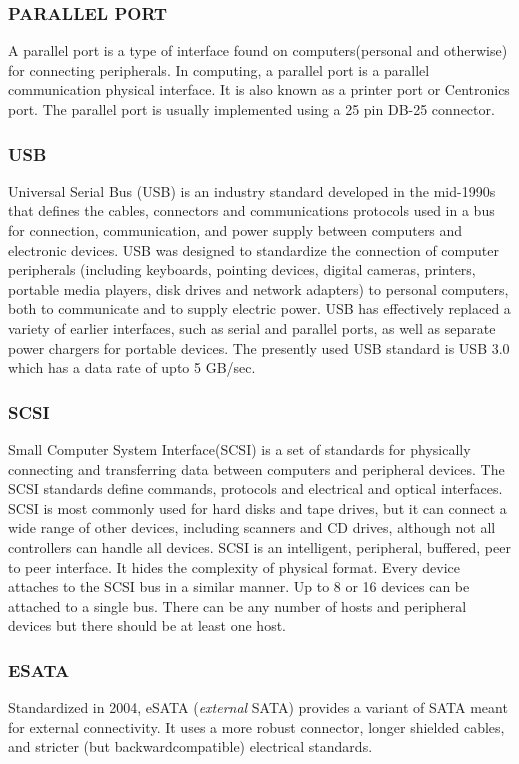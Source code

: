 \documentclass[a4paper,28pt]{report}
\begin{document}
\subsubsection*{PARALLEL PORT}
	 A parallel port is a type of interface found on computers(personal and otherwise) for
	connecting peripherals. In computing, a parallel port is a parallel communication physical interface. It is
	also known as a printer port or Centronics port. The parallel port is usually implemented using a 25 pin DB-25 connector.
\subsubsection*{ USB}
	 Universal Serial Bus (USB) is an industry standard developed in the mid-1990s that defines the
	cables, connectors and communications protocols used in a bus for connection, communication, and power
	supply between computers and electronic devices. USB was designed to standardize the connection
	of computer peripherals (including keyboards, pointing devices, digital cameras, printers, portable media
	players, disk drives and network adapters) to personal computers, both to communicate and to
	supply electric power. USB has effectively replaced a variety of earlier interfaces, such as serial and parallel 		ports,
	as well as separate power chargers for portable devices. The presently used USB standard is USB 3.0 which
	has a data rate of upto 5 GB/sec.
\subsubsection*{ SCSI}
	 Small Computer System Interface(SCSI) is a set of standards for physically connecting and
	transferring data between computers and peripheral devices. The SCSI standards define commands,
	protocols and electrical and optical interfaces. SCSI is most commonly used for hard disks and tape drives,
	but it can connect a wide range of other devices, including scanners and CD drives, although not all
	controllers can handle all devices. SCSI is an intelligent, peripheral, buffered, peer to peer interface. It hides
	the complexity of physical format. Every device attaches to the SCSI bus in a similar manner. Up to 8 or 16
	devices can be attached to a single bus. There can be any number of hosts and peripheral devices but there
	should be at least one host.
\subsubsection*{ESATA}
	 Standardized in 2004, eSATA (\emph{external} SATA) provides a variant of SATA meant for
	external connectivity. It uses a more robust connector, longer shielded cables, and stricter (but backwardcompatible)
	electrical standards.
\end{document}
